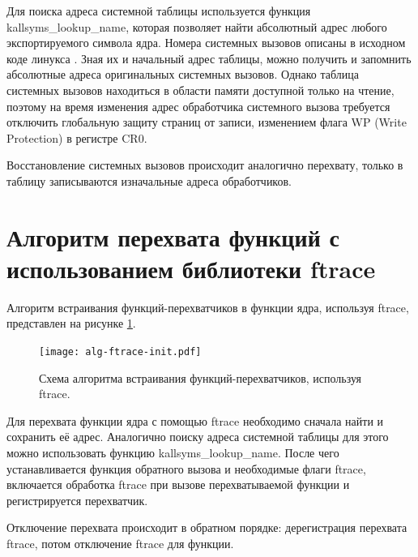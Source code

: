         Для поиска адреса системной таблицы используется функция kallsyms\_lookup\_name,
        которая позволяет найти абсолютный адрес любого экспортируемого символа ядра.
        Номера системных вызовов описаны в исходном коде линукса \cite{linux-nomer-syscall}.
        Зная их и начальный адрес таблицы, можно получить и запомнить абсолютные адреса оригинальных системных вызовов.
        Однако таблица системных вызовов находиться в области памяти доступной только на чтение,
        поэтому на время изменения адрес обработчика системного вызова 
        требуется отключить глобальную защиту страниц от записи,
        изменением флага WP (Write Protection) в регистре CR0.

        Восстановление системных вызовов происходит аналогично перехвату,
        только в таблицу записываются изначальные адреса обработчиков.

    \section{Алгоритм перехвата функций с использованием библиотеки ftrace}
        \label{design:alg:hook:ftrace}
        Алгоритм встраивания функций-перехватчиков в функции ядра, 
        используя ftrace, представлен на рисунке \ref{schema:ftrace:init:hook:alg}.
        \begin{figure}[h!]
            \centering
            \texttt{[image: alg-ftrace-init.pdf]}
            \caption{Схема алгоритма встраивания функций-перехватчиков, используя ftrace.}
            \label{schema:ftrace:init:hook:alg}
        \end{figure}

        Для перехвата функции ядра с помощью ftrace необходимо сначала найти и сохранить её адрес.
        Аналогично поиску адреса системной таблицы для этого можно использовать функцию kallsyms\_lookup\_name.
        После чего устанавливается функция обратного вызова и необходимые флаги ftrace,
        включается обработка ftrace при вызове перехватываемой функции
        и регистрируется перехватчик.

        Отключение перехвата происходит в обратном порядке:
        дерегистрация перехвата ftrace, потом отключение ftrace для функции.



